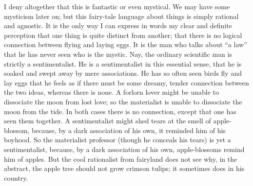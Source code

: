 I deny altogether that this is fantastic or even mystical. We may have some mysticism later on; but this fairy-tale language about things is simply rational and agnostic. It is the only way I can express in words my clear and definite perception that one thing is quite distinct from another; that there is no logical connection between flying and laying eggs. It is the man who talks about “a law” that he has never seen who is the mystic. Nay, the ordinary scientific man is strictly a sentimentalist. He is a sentimentalist in this essential sense, that he is soaked and swept away by mere associations. He has so often seen birds fly and lay eggs that he feels as if there must be some dreamy, tender connection between the two ideas, whereas there is none. A forlorn lover might be unable to dissociate the moon from lost love; so the materialist is unable to dissociate the moon from the tide. In both cases there is no connection, except that one has seen them together. A sentimentalist might shed tears at the smell of apple-blossom, because, by a dark association of his own, it reminded him of his boyhood. So the materialist professor (though he conceals his tears) is yet a sentimentalist, because, by a dark association of his own, apple-blossoms remind him of apples. But the cool rationalist from fairyland does not see why, in the abstract, the apple tree should not grow crimson tulips; it sometimes does in his country.

